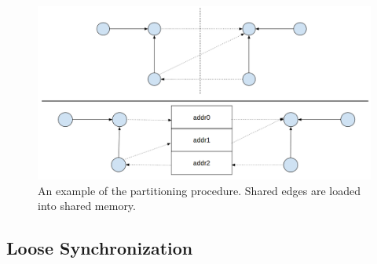 \begin{figure}[h]
\includegraphics[width=\linewidth]{"fig/partition_example"}
\caption{An example of the partitioning procedure. Shared edges are loaded into shared memory.}
\end{figure}

\subsection{Loose Synchronization}



